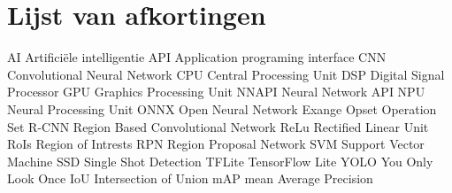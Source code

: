 \chapter*{Lijst van afkortingen}
AI      Artifici\"ele intelligentie \newline
API     Application programing interface \newline
CNN     Convolutional Neural Network \newline
CPU     Central Processing Unit \newline
DSP     Digital Signal Processor \newline
GPU     Graphics Processing Unit \newline
NNAPI   Neural Network API \newline
NPU     Neural Processing Unit \newline
ONNX    Open Neural Network Exange \newline
Opset   Operation Set \newline
R-CNN   Region Based Convolutional Network \newline
ReLu    Rectified Linear Unit \newline
RoIs    Region of Intrests \newline
RPN     Region Proposal Network \newline
SVM     Support Vector Machine \newline
SSD     Single Shot Detection \newline
TFLite  TensorFlow Lite \newline
YOLO    You Only Look Once \newline
IoU     Intersection of Union \newline
mAP     mean Average Precision